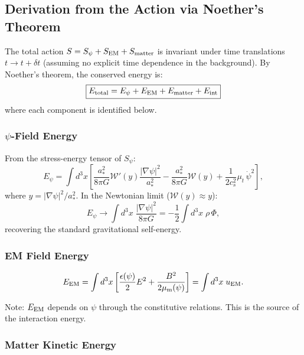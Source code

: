 \documentclass[aps,prd,twocolumn,superscriptaddress,floatfix,nofootinbib]{revtex4-2}
\newcommand{\astar}{a_*}
\newcommand{\Wfunc}{\mathcal{W}}
\newcommand{\mufunction}{\mu}
\begin{document}
\subsection{Derivation from the Action via Noether's Theorem}

The total action $S = S_\psi + S_{\rm EM} + S_{\rm matter}$ is invariant
under time translations $t \to t + \delta t$ (assuming no explicit time
dependence in the background). By Noether's theorem, the conserved
energy is:
\begin{equation}
\boxed{
E_{\rm total} = E_\psi + E_{\rm EM} + E_{\rm matter} + E_{\rm int}
}
\label{eq:total-energy}
\end{equation}
where each component is identified below.

\subsubsection{$\psi$-Field Energy}

From the stress-energy tensor of $S_\psi$:
\begin{equation}
E_\psi = \int d^3x\left[
\frac{\astar^2}{8\pi G}\Wfunc'(y)\frac{|\nabla\psi|^2}{\astar^2}
- \frac{\astar^2}{8\pi G}\Wfunc(y)
+ \frac{1}{2c_s^2}\mufunction_t\,\dot\psi^2
\right],
\label{eq:E-psi}
\end{equation}
where $y = |\nabla\psi|^2/\astar^2$. In the Newtonian limit
($\Wfunc(y) \approx y$):
\begin{equation}
E_\psi \to \int d^3x\;\frac{|\nabla\psi|^2}{8\pi G}
= -\frac{1}{2}\int d^3x\;\rho\,\Phi,
\label{eq:E-psi-Newton}
\end{equation}
recovering the standard gravitational self-energy.

\subsubsection{EM Field Energy}

\begin{equation}
E_{\rm EM} = \int d^3x\left[
\frac{\epsilon(\psi)}{2}E^2 + \frac{B^2}{2\mu_{\rm m}(\psi)}
\right]
= \int d^3x\;u_{\rm EM}.
\label{eq:E-EM}
\end{equation}

Note: $E_{\rm EM}$ depends on $\psi$ through the constitutive relations.
This is the source of the interaction energy.

\subsubsection{Matter Kinetic Energy}
\end{document}
